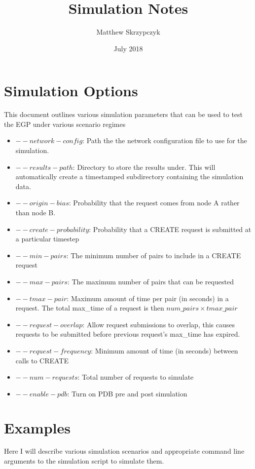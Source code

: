 \documentclass{article}
\title{Simulation Notes}
\author{Matthew Skrzypczyk}
\date{July 2018}
\begin{document}
\maketitle

\section{Simulation Options}
This document outlines various simulation parameters that can be used to test the EGP under various scenario regimes
\begin{itemize}
    \item $--network-config$: Path the the network configuration file to use for the simulation.
    \item $--results-path$: Directory to store the results under.  This will automatically create a timestamped subdirectory containing the simulation data.
    \item $--origin-bias$: Probability that the request comes from node A rather than node B.
    \item $--create-probability$: Probability that a CREATE request is submitted at a particular timestep
    \item $--min-pairs$: The minimum number of pairs to include in a CREATE request
    \item $ --max-pairs$: The maximum number of pairs that can be requested
    \item $--tmax-pair$: Maximum amount of time per pair (in seconds) in a request.  The total max\_time of a request is then $num\_pairs \times tmax\_pair$
    \item $--request-overlap$: Allow request submissions to overlap, this causes requests to be submitted before previous request's max\_time has expired.
    \item $--request-frequency$: Minimum amount of time (in seconds) between calls to CREATE
    \item $--num-requests$: Total number of requests to simulate
    \item $--enable-pdb$: Turn on PDB pre and post simulation
\end{itemize}

\section{Examples}
Here I will describe various simulation scenarios and appropriate command line arguments to the simulation script to simulate them.
\end{document}

